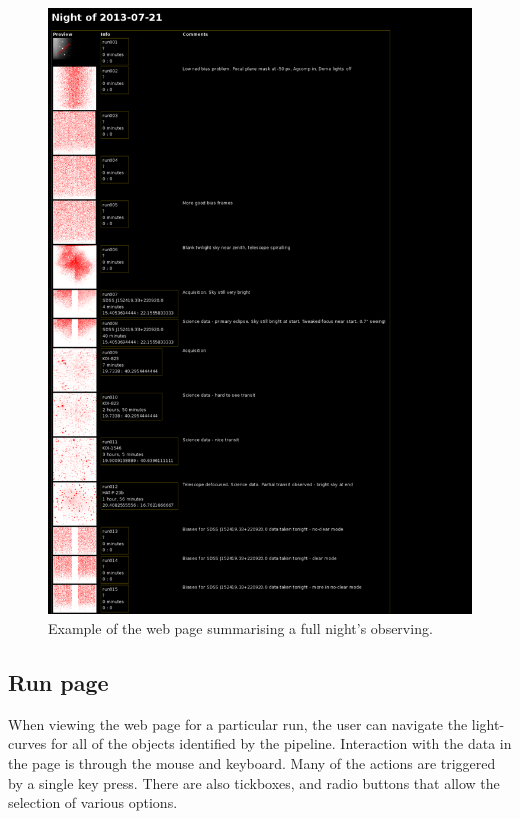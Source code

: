 \begin{figure}
  \centering
  \includegraphics[width=120mm]{images/index_webpage.png}
  \caption{Example of the web page summarising a full night's observing.}
  \label{fig:indexwebpage}
\end{figure}

\subsection{Run page}
When viewing the web page for a particular run, the user can navigate the light-curves for all of the objects identified by the pipeline. Interaction with the data in the page is through the mouse and keyboard. Many of the actions are triggered by a single key press. There are also tickboxes, and radio buttons that allow the selection of various options. 


